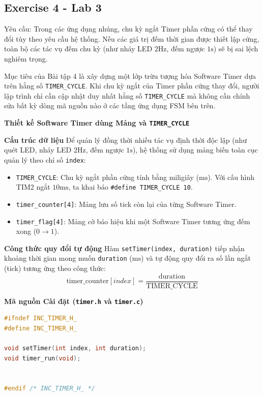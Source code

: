 \subsection{Exercise 4 - Lab 3}

Yêu cầu: Trong các ứng dụng nhúng, chu kỳ ngắt Timer phần cứng có thể thay đổi tùy theo yêu cầu hệ thống. Nếu các giá trị đếm thời gian được thiết lập cứng, toàn bộ các tác vụ đếm chu kỳ (như nháy LED $2\text{Hz}$, đếm ngược $1\text{s}$) sẽ bị sai lệch nghiêm trọng.

Mục tiêu của Bài tập 4 là xây dựng một lớp trừu tượng hóa Software Timer dựa trên hằng số \texttt{TIMER\_CYCLE}. Khi chu kỳ ngắt của Timer phần cứng thay đổi, người lập trình chỉ cần cập nhật duy nhất hằng số \texttt{TIMER\_CYCLE} mà không cần chỉnh sửa bất kỳ dòng mã nguồn nào ở các tầng ứng dụng FSM bên trên.

\textbf{Thiết kế Software Timer dùng Mảng và \texttt{TIMER\_CYCLE}}

\textbf{Cấu trúc dữ liệu}
Để quản lý đồng thời nhiều tác vụ định thời độc lập (như quét LED, nháy LED $2\text{Hz}$, đếm ngược $1\text{s}$), hệ thống sử dụng mảng biến toàn cục quản lý theo chỉ số \texttt{index}:
\begin{itemize}
    \item \texttt{TIMER\_CYCLE}: Chu kỳ ngắt phần cứng tính bằng miligiây ($\text{ms}$). Với cấu hình TIM2 ngắt $10\text{ms}$, ta khai báo \texttt{\#define TIMER\_CYCLE 10}.
    \item \texttt{timer\_counter[4]}: Mảng lưu số tick còn lại của từng Software Timer.
    \item \texttt{timer\_flag[4]}: Mảng cờ báo hiệu khi một Software Timer tương ứng đếm xong ($0 \rightarrow 1$).
\end{itemize}

\textbf{Công thức quy đổi tự động}
Hàm \texttt{setTimer(index, duration)} tiếp nhận khoảng thời gian mong muốn \texttt{duration} ($\text{ms}$) và tự động quy đổi ra số lần ngắt (tick) tương ứng theo công thức:
\[
\text{timer\_counter}[index] = \frac{\text{duration}}{\text{TIMER\_CYCLE}}
\]

\textbf{Mã nguồn Cài đặt (\texttt{timer.h} và \texttt{timer.c})}
\begin{lstlisting}[language=C, caption={File timer.h}]
#ifndef INC_TIMER_H_
#define INC_TIMER_H_

void setTimer(int index, int duration);
void timer_run(void);


#endif /* INC_TIMER_H_ */
\end{lstlisting}

